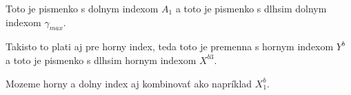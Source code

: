 \documentclass{book}
\begin{document}
Toto je pismenko s dolnym indexom $A_1$ a toto je pismenko s dlhsim dolnym indexom $\gamma_{max}$.

Takisto to plati aj pre horny index, teda toto je premenna s hornym indexom $Y^b$ a toto je pismenko s dlhsim hornym indexom $X^{b3}$.

Mozeme horny a dolny index aj kombinovať ako napríklad $X^b_1$.
\end{document}
